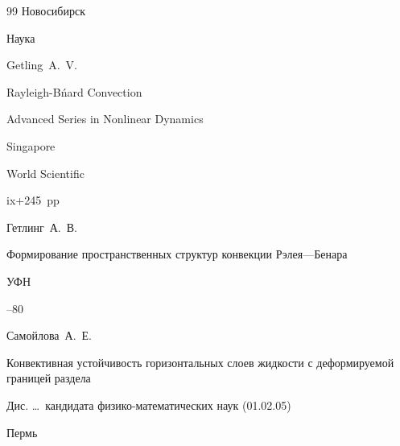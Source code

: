 \begin{thebibliography}{99}
\publaddr Новосибирск

\publ Наука



%












\by Getling~A.~V.

\book Rayleigh-B\'nard Convection

\serial Advanced Series in Nonlinear Dynamics



\publaddr Singapore

\publ World Scientific

\totalpages ix+245~pp \nofrills









\by Гетлинг~А.~В.

\paper Формирование пространственных структур конвекции Рэлея—Бенара

\jour УФН 



–80 







\by Самойлова~А.~Е.

\thesis Конвективная устойчивость горизонтальных слоев жидкости с деформируемой границей раздела

\thesisinfo Дис. \dots\ кандидата физико-математических наук (01.02.05)

\publaddr Пермь



\end{thebibliography}
